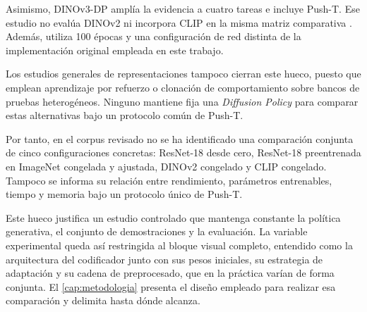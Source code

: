 Asimismo, DINOv3-DP ampl\'ia la evidencia a cuatro tareas e incluye Push-T. Ese
estudio no eval\'ua DINOv2 ni incorpora CLIP en la misma matriz comparativa
\cite{egbe2025dinov3dp}. Adem\'as, utiliza 100 \'epocas y una configuraci\'on de red
distinta de la implementaci\'on original empleada en este trabajo.

Los estudios generales de representaciones tampoco cierran este hueco, puesto que
emplean aprendizaje por refuerzo o clonaci\'on de comportamiento sobre bancos de
pruebas heterog\'eneos. Ninguno mantiene fija una \textit{Diffusion Policy} para
comparar estas alternativas bajo un protocolo com\'un de Push-T.

Por tanto, en el corpus revisado no se ha identificado una comparaci\'on conjunta de
cinco configuraciones concretas: ResNet-18 desde cero, ResNet-18 preentrenada en
ImageNet congelada y ajustada, DINOv2 congelado y CLIP congelado. Tampoco se informa
su relaci\'on entre rendimiento, par\'ametros entrenables, tiempo y memoria bajo un
protocolo \'unico de Push-T.

Este hueco justifica un estudio controlado que mantenga constante la pol\'itica
generativa, el conjunto de demostraciones y la evaluaci\'on. La variable experimental
queda as\'i restringida al bloque visual completo, entendido como la arquitectura del
codificador junto con sus pesos iniciales, su estrategia de adaptaci\'on y su cadena de
preprocesado, que en la pr\'actica var\'ian de forma conjunta. El \cref{cap:metodologia}
presenta el dise\~no empleado para realizar esa comparaci\'on y delimita hasta d\'onde
alcanza.
